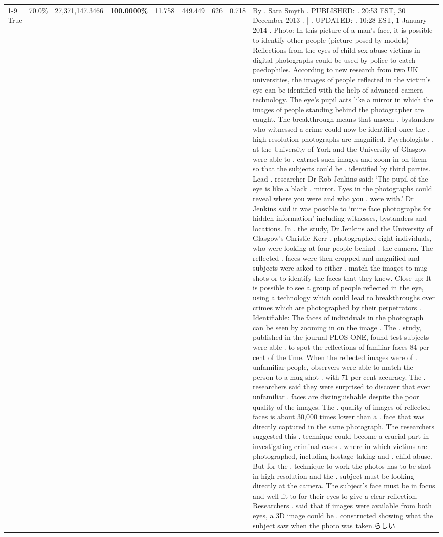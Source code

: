 \begin{table}[H]
\begin{tabular}{lllrlllll}
\cline{1-9}
True & 70.0\% & 27,371,147.3466 & \bfseries \color{red} 100.0000\% & 11.758 & 449.449 & 626 & 0.718 & By . Sara Smyth . PUBLISHED: . 20:53 EST, 30 December 2013 . | . UPDATED: . 10:28 EST, 1 January 2014 . Photo: In this picture of a man's face, it is possible to identify other people (picture posed by models) Reflections from the eyes of child sex abuse victims in digital photographs could be used by police to catch paedophiles. According to new research from two UK universities, the images of people reflected in the victim's eye can be identified with the help of advanced camera technology. The eye's pupil acts like a mirror in which the images of people standing behind the photographer are caught. The breakthrough means that unseen . bystanders who witnessed a crime could now be identified once the . high-resolution photographs are magnified. Psychologists . at the University of York and the University of Glasgow were able to . extract such images and zoom in on them so that the subjects could be . identified by third parties. Lead . researcher Dr Rob Jenkins said: ‘The pupil of the eye is like a black . mirror. Eyes in the photographs could reveal where you were and who you . were with.' Dr Jenkins said it was possible to ‘mine face photographs for hidden information' including witnesses, bystanders and locations. In . the study, Dr Jenkins and the University of Glasgow's Christie Kerr . photographed eight individuals, who were looking at four people behind . the camera. The reflected . faces were then cropped and magnified and subjects were asked to either . match the images to mug shots or to identify the faces that they knew. Close-up: It is possible to see a group of people reflected in the eye, using a technology which could lead to breakthroughs over crimes which are photographed by their perpetrators . Identifiable: The faces of individuals in the photograph can be seen by zooming in on the image . The . study, published in the journal PLOS ONE, found test subjects were able . to spot the reflections of familiar faces 84 per cent of the time. When the reflected images were of . unfamiliar people, observers were able to match the person to a mug shot . with 71 per cent accuracy. The . researchers said they were surprised to discover that even unfamiliar . faces are distinguishable despite the poor quality of the images. The . quality of images of reflected faces is about 30,000 times lower than a . face that was directly captured in the same photograph. The researchers suggested this . technique could become a crucial part in investigating criminal cases . where in which victims are photographed, including hostage-taking and . child abuse. But for the . technique to work the photos has to be shot in high-resolution and the . subject must be looking directly at the camera. The subject's face must be in focus and well lit to for their eyes to give a clear reflection. Researchers . said that if images were available from both eyes, a 3D image could be . constructed showing what the subject saw when the photo was taken.らしい \\

\end{tabular}
\end{table}
